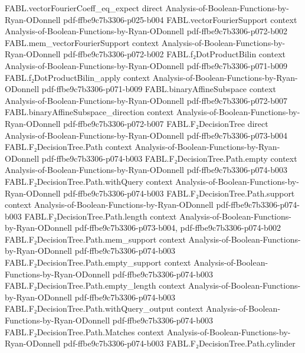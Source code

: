 \begin{theorem}
\proofstep
  {FABL.vectorFourierCoeff_eq_expect}
  {direct}
  {Analysis-of-Boolean-Functions-by-Ryan-ODonnell}
  {pdf-ffbe9c7b3306-p025-b004}
\proofstep
  {FABL.vectorFourierSupport}
  {context}
  {Analysis-of-Boolean-Functions-by-Ryan-ODonnell}
  {pdf-ffbe9c7b3306-p072-b002}
\proofstep
  {FABL.mem_vectorFourierSupport}
  {context}
  {Analysis-of-Boolean-Functions-by-Ryan-ODonnell}
  {pdf-ffbe9c7b3306-p072-b002}
\proofstep
  {FABL.f₂DotProductBilin}
  {context}
  {Analysis-of-Boolean-Functions-by-Ryan-ODonnell}
  {pdf-ffbe9c7b3306-p071-b009}
\proofstep
  {FABL.f₂DotProductBilin_apply}
  {context}
  {Analysis-of-Boolean-Functions-by-Ryan-ODonnell}
  {pdf-ffbe9c7b3306-p071-b009}
\proofstep
  {FABL.binaryAffineSubspace}
  {context}
  {Analysis-of-Boolean-Functions-by-Ryan-ODonnell}
  {pdf-ffbe9c7b3306-p072-b007}
\proofstep
  {FABL.binaryAffineSubspace_direction}
  {context}
  {Analysis-of-Boolean-Functions-by-Ryan-ODonnell}
  {pdf-ffbe9c7b3306-p072-b007}
\proofstep
  {FABL.F₂DecisionTree}
  {direct}
  {Analysis-of-Boolean-Functions-by-Ryan-ODonnell}
  {pdf-ffbe9c7b3306-p073-b004}
\proofstep
  {FABL.F₂DecisionTree.Path}
  {context}
  {Analysis-of-Boolean-Functions-by-Ryan-ODonnell}
  {pdf-ffbe9c7b3306-p074-b003}
\proofstep
  {FABL.F₂DecisionTree.Path.empty}
  {context}
  {Analysis-of-Boolean-Functions-by-Ryan-ODonnell}
  {pdf-ffbe9c7b3306-p074-b003}
\proofstep
  {FABL.F₂DecisionTree.Path.withQuery}
  {context}
  {Analysis-of-Boolean-Functions-by-Ryan-ODonnell}
  {pdf-ffbe9c7b3306-p074-b003}
\proofstep
  {FABL.F₂DecisionTree.Path.support}
  {context}
  {Analysis-of-Boolean-Functions-by-Ryan-ODonnell}
  {pdf-ffbe9c7b3306-p074-b003}
\proofstep
  {FABL.F₂DecisionTree.Path.length}
  {context}
  {Analysis-of-Boolean-Functions-by-Ryan-ODonnell}
  {pdf-ffbe9c7b3306-p073-b004,
    pdf-ffbe9c7b3306-p074-b002}
\proofstep
  {FABL.F₂DecisionTree.Path.mem_support}
  {context}
  {Analysis-of-Boolean-Functions-by-Ryan-ODonnell}
  {pdf-ffbe9c7b3306-p074-b003}
\proofstep
  {FABL.F₂DecisionTree.Path.empty_support}
  {context}
  {Analysis-of-Boolean-Functions-by-Ryan-ODonnell}
  {pdf-ffbe9c7b3306-p074-b003}
\proofstep
  {FABL.F₂DecisionTree.Path.empty_length}
  {context}
  {Analysis-of-Boolean-Functions-by-Ryan-ODonnell}
  {pdf-ffbe9c7b3306-p074-b003}
\proofstep
  {FABL.F₂DecisionTree.Path.withQuery_output}
  {context}
  {Analysis-of-Boolean-Functions-by-Ryan-ODonnell}
  {pdf-ffbe9c7b3306-p074-b003}
\proofstep
  {FABL.F₂DecisionTree.Path.Matches}
  {context}
  {Analysis-of-Boolean-Functions-by-Ryan-ODonnell}
  {pdf-ffbe9c7b3306-p074-b003}
\proofstep
  {FABL.F₂DecisionTree.Path.cylinder}

\end{theorem}
